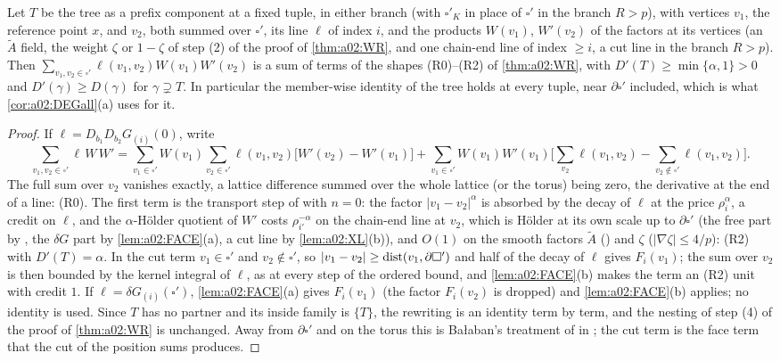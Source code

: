 \begin{proposition}\label{prop:a02:TREE}
Let $T$ be the tree \cite[(2.4)]{Ba3} as a prefix component at a fixed tuple, in either branch (with $\square'_K$ in place of $\square'$ in the branch $R>p$), with vertices $v_1$, the reference point $x$, and $v_2$, both summed over $\square'$, its line $\ell$ of index $i$, and the products $W(v_1)$, $W'(v_2)$ of the factors at its vertices (an $\tilde A$ field, the weight $\zeta$ or $1-\zeta$ of step (2) of the proof of \cref{thm:a02:WR}, and one chain-end line of index $\ge i$, a cut line in the branch $R>p$). Then $\sum_{v_1,v_2\in\square'}\ell(v_1,v_2)W(v_1)W'(v_2)$ is a sum of terms of the shapes \textup{(R0)}--\textup{(R2)} of \cref{thm:a02:WR}, with $D'(T)\ge\min\{\alpha,1\}>0$ and $D'(\gamma)\ge D(\gamma)$ for $\gamma\supsetneq T$. In particular the member-wise identity of the tree holds at every tuple, near $\partial\square'$ included, which is what \cref{cor:a02:DEGall}(a) uses for it.
\end{proposition}
\begin{proof}
If $\ell=D_{b_1}D_{b_2}G_{(i)}(0)$, write
\[
\sum_{v_1,v_2\in\square'}\ell\,W\,W'=\sum_{v_1\in\square'}W(v_1)\sum_{v_2\in\square'}\ell(v_1,v_2)\big[W'(v_2)-W'(v_1)\big]+\sum_{v_1\in\square'}W(v_1)W'(v_1)\Big[\sum_{v_2}\ell(v_1,v_2)-\sum_{v_2\notin\square'}\ell(v_1,v_2)\Big].
\]
The full sum over $v_2$ vanishes exactly, a lattice difference summed over the whole lattice (or the torus) being zero, the derivative at the end of a line: \textup{(R0)}. The first term is the transport step of \cite[(3.10)]{Ba3} with $n=0$: the factor $|v_1-v_2|^\alpha$ is absorbed by the decay of $\ell$ at the price $\rho_i^\alpha$, a credit on $\ell$, and the $\alpha$-H\"older quotient of $W'$ costs $\rho_{i'}^{-\alpha}$ on the chain-end line at $v_2$, which is H\"older at its own scale up to $\partial\square'$ (the free part by \cite[(3.65)]{K1}, the $\delta G$ part by \cref{lem:a02:FACE}(a), a cut line by \cref{lem:a02:XL}(b)), and $O(1)$ on the smooth factors $\tilde A$ (\cite[(3.45)]{K1}) and $\zeta$ ($|\nabla\zeta|\le4/p$): \textup{(R2)} with $D'(T)=\alpha$. In the cut term $v_1\in\square'$ and $v_2\notin\square'$, so $|v_1-v_2|\ge\operatorname{dist}(v_1,\partial\square')$ and half of the decay of $\ell$ gives $F_i(v_1)$; the sum over $v_2$ is then bounded by the kernel integral of $\ell$, as at every step of the ordered bound, and \cref{lem:a02:FACE}(b) makes the term an \textup{(R2)} unit with credit $1$. If $\ell=\delta G_{(i)}(\square')$, \cref{lem:a02:FACE}(a) gives $F_i(v_1)$ (the factor $F_i(v_2)$ is dropped) and \cref{lem:a02:FACE}(b) applies; no identity is used. Since $T$ has no partner and its inside family is $\{T\}$, the rewriting is an identity term by term, and the nesting of step (4) of the proof of \cref{thm:a02:WR} is unchanged. Away from $\partial\square'$ and on the torus this is Ba{\l}aban's treatment of \cite[(2.4)]{Ba3} in \cite[Prop.~2.1]{Ba3}; the cut term is the face term that the cut of the position sums produces.
\end{proof}
